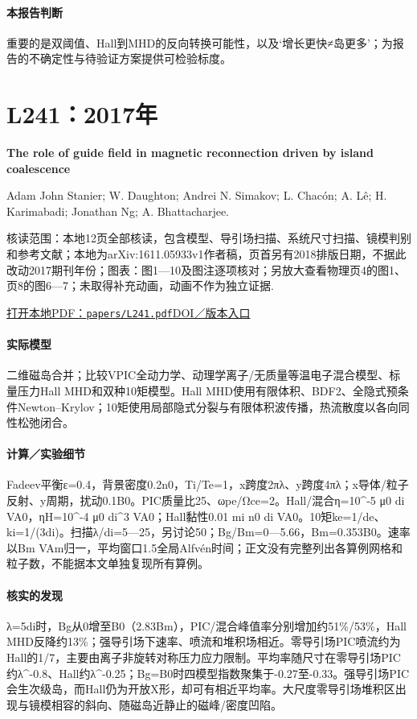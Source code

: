 \paragraph{本报告判断}重要的是双阈值、Hall到MHD的反向转换可能性，以及‘增长更快≠岛更多’；为报告的不确定性与待验证方案提供可检验标度。

\section{L241：2017年}\label{paper:L241}

\textbf{The role of guide field in magnetic reconnection driven by island coalescence}\citep{L241}\

Adam  John Stanier;  W. Daughton;  Andrei N. Simakov;  L. Chacón;  A. Lê;  H. Karimabadi;  Jonathan Ng;  A. Bhattacharjee.

\textsf{核读范围：}本地12页全部核读，包含模型、导引场扫描、系统尺寸扫描、镜模判别和参考文献；本地为arXiv:1611.05933v1作者稿，页首另有2018排版日期，不据此改动2017期刊年份；\textsf{图表：}图1—10及图注逐项核对；另放大查看物理页4的图1、页8的图6—7；未取得补充动画，动画不作为独立证据.

\href{run:papers/L241.pdf}{打开本地PDF：\texttt{papers/L241.pdf}}\quad\href{https://doi.org/10.1063/1.4976712}{DOI／版本入口}

\paragraph{实际模型}二维磁岛合并；比较VPIC全动力学、动理学离子/无质量等温电子混合模型、标量压力Hall MHD和双种10矩模型。Hall MHD使用有限体积、BDF2、全隐式预条件Newton–Krylov；10矩使用局部隐式分裂与有限体积波传播，热流散度以各向同性松弛闭合。

\paragraph{计算／实验细节}Fadeev平衡ε=0.4，背景密度0.2n0，Ti/Te=1，x跨度2πλ、y跨度4πλ；x导体/粒子反射、y周期，扰动0.1B0。PIC质量比25、ωpe/Ωce=2。Hall/混合η=10\textasciicircum{}-5 μ0 di VA0，ηH=10\textasciicircum{}-4 μ0 di\textasciicircum{}3 VA0；Hall黏性0.01 mi n0 di VA0。10矩ke=1/de、ki=1/(3di)。扫描λ/di=5—25，另讨论50；Bg/Bm=0—5.66，Bm=0.353B0。速率以Bm VAm归一，平均窗口1.5全局Alfvén时间；正文没有完整列出各算例网格和粒子数，不能据本文单独复现所有算例。

\paragraph{核实的发现}λ=5di时，Bg从0增至B0（2.83Bm），PIC/混合峰值率分别增加约51\%/53\%，Hall MHD反降约13\%；强导引场下速率、喷流和堆积场相近。零导引场PIC喷流约为Hall的1/7，主要由离子非旋转对称压力应力限制。平均率随尺寸在零导引场PIC约λ\textasciicircum{}-0.8、Hall约λ\textasciicircum{}-0.25；Bg=B0时四模型指数聚集于-0.27至-0.33。强导引场PIC会生次级岛，而Hall仍为开放X形，却可有相近平均率。大尺度零导引场堆积区出现与镜模相容的斜向、随磁岛近静止的磁峰/密度凹陷。

